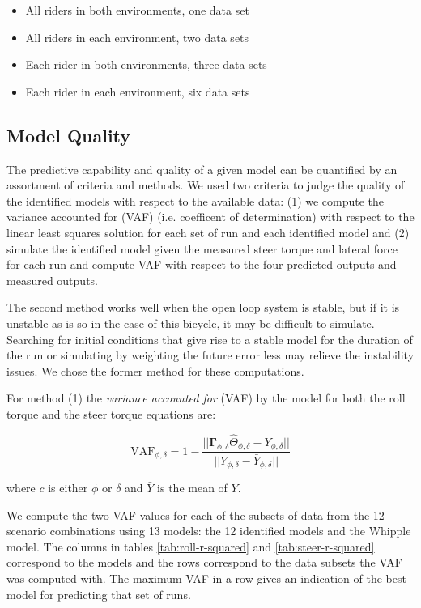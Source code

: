 \documentclass[a4paper]{article}
\begin{document}
\begin{itemize}
  \item
    All riders in both environments, one data set
  \item
    All riders in each environment, two data sets
  \item
    Each rider in both environments, three data sets
  \item
    Each rider in each environment, six data sets
\end{itemize}

\subsection{Model Quality}

The predictive capability and quality of a given model can be quantified by an
assortment of criteria and methods. We used two criteria to judge the quality
of the identified models with respect to the available data: (1) we compute the
variance accounted for (VAF) (i.e. coefficent of determination) with respect to
the linear least squares solution for each set of run and each identified model
and (2) simulate the identified model given the measured steer torque and
lateral force for each run and compute VAF with respect to the four predicted
outputs and measured outputs.

The second method works well when the open loop system is stable, but if it is
unstable as is so in the case of this bicycle, it may be difficult to simulate.
Searching for initial conditions that give rise to a stable model for the
duration of the run or simulating by weighting the future error less may
relieve the instability issues. We chose the former method for these
computations.

For method (1) the \emph{variance accounted for} (VAF) by the model for both
the roll torque and the steer torque equations are:

\begin{equation}
  \label{eq:vaf}
  \textrm{VAF}_{\phi,\delta} = 1 - \frac{\vert \vert
    \mathbf{\Gamma}_{\phi,\delta}\hat{\Theta}_{\phi,\delta} - Y_{\phi,\delta} \vert \vert}
                            {\vert \vert Y_{\phi,\delta} - \bar{Y}_{\phi,\delta} \vert \vert}
\end{equation}

where $c$ is either $\phi$ or $\delta$ and $\bar{Y}$ is the mean of $Y$.

We compute the two VAF values for each of the subsets of data from the 12
scenario combinations using 13 models: the 12 identified models and the Whipple
model. The columns in tables \ref{tab:roll-r-squared} and
\ref{tab:steer-r-squared} correspond to the models and the rows correspond to
the data subsets the VAF was computed with. The maximum VAF in a row gives an
indication of the best model for predicting that set of runs.
\end{document}

